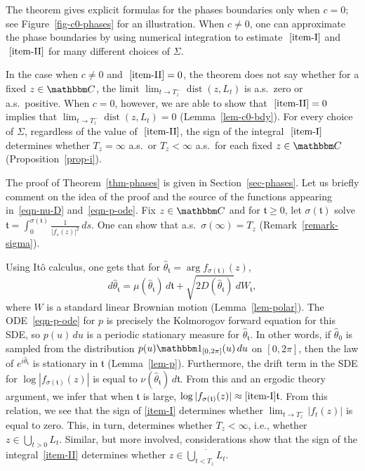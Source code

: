 \documentclass[11pt]{article}
\theoremstyle{plain}
\theoremstyle{definition}
\newtheorem{remark}[thm]{Remark}
\numberwithin{equation}{section}
\newcommand{\eqb}{\begin{equation}}
\newcommand{\eqe}{\end{equation}}
\newcommand{\BB}{\mathbbm}
\newcommand{\ol}{\overline}
\newcommand{\op}{\operatorname}
\newcommand{\rta}{\rightarrow}
\newcommand{\wh}{\widehat}
\newcommand{\SLEG}{{\operatorname{SLE}}_\Sigma}
\newcommand{\tz}{{\mathfrak t}}
\begin{document}
The theorem gives explicit formulas for the phases boundaries only when $c=0$; see Figure~\ref{fig-c0-phases} for an illustration. 
When $c\not=0$, one can approximate the phase boundaries by using numerical integration to estimate $~\ref{item-I}$ and $~\ref{item-II}$ for many different choices of $\Sigma$. 

In the case when $c\not=0$ and $~\ref{item-II}=0$, the theorem does not say whether for a fixed $z\in\BB C$, the limit $\lim_{t\rta T_z^-} \op{dist}(z,L_t)$ is a.s.\ zero or a.s.\ positive. When $c=0$, however, we are able to show that $~\ref{item-II} =0$ implies that $\lim_{t\rta T_z^-} \op{dist}(z,L_t) = 0$ (Lemma~\ref{lem-c0-bdy}). 
For every choice of $\Sigma$, regardless of the value of $~\ref{item-II}$, the sign of the integral $~\ref{item-I}$ determines whether $T_z = \infty$ a.s.\ or $T_z < \infty$ a.s.\ for each fixed $z\in\BB C$ (Proposition~\ref{prop-i}). 





The proof of Theorem~\ref{thm-phases} is given in Section~\ref{sec-phases}. Let us briefly comment on the idea of the proof and the source of the functions appearing in~\eqref{eqn-nu-D} and~\eqref{eqn-p-ode}. Fix $z\in\BB C$ and for $\tz \geq 0$, let $\sigma(\tz)$ solve $\tz = \int_0^{\sigma(\tz)} \frac{1}{|f_s(z)|^2} \,ds$. One can show that a.s.\ $\sigma(\infty) = T_z$ (Remark~\ref{remark-sigma}).

Using It\^o calculus, one gets that for $\wh\theta_\tz  = \op{arg} f_{\sigma(\tz)}(z)$, 
\eqb
d\wh\theta_\tz  = \mu(\wh\theta_\tz) \,d\tz + \sqrt{2D(\wh\theta_\tz)} \,dW_\tz ,
\eqe
where $W$ is a standard linear Brownian motion (Lemma~\ref{lem-polar}). The ODE~\eqref{eqn-p-ode} for $p$ is precisely the Kolmorogov forward equation for this SDE, so $p(u)\,du$ is a periodic stationary measure for $\wh\theta_\tz$.  In other words, if $\wh\theta_0$ is sampled from the distribution $p(u) \BB 1_{[0,2\pi]}(u) \,du$ on $[0,2\pi]$, then the law of $e^{i\wh\theta_\tz}$ is stationary in $\tz$ (Lemma~\ref{lem-p}). Furthermore, the drift term in the SDE for $\log |f_{\sigma(\tz)}(z)|$ is equal to $\nu(\wh\theta_\tz)\,d\tz$. From this and an ergodic theory argument, we infer that when $\tz$ is large, $\log |f_{\sigma(\tz)}(z)| \approx \ref{item-I} \tz$. From this relation, we see that the sign of \ref{item-I} determines whether $\lim_{t \rta T_z^-} |f_t(z)|$ is equal to zero. This, in turn, determines whether $T_z < \infty$, i.e., whether $z\in \bigcup_{t>0} L_t$. Similar, but more involved, considerations show that the sign of the integral~\ref{item-II} determines whether $z\in \ol{\bigcup_{t < T_z} L_t}$.  
\end{document}
